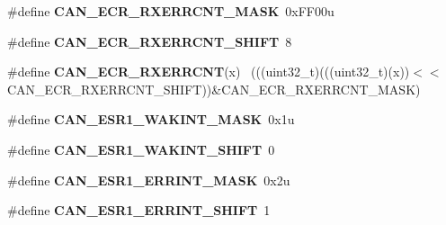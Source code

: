 \begin{DoxyCompactItemize}
\item 
\hypertarget{group___c_a_n___register___masks_gaed0f3cf7cea69b12a5166e67ad58b98e}{}\#define {\bfseries C\+A\+N\+\_\+\+E\+C\+R\+\_\+\+R\+X\+E\+R\+R\+C\+N\+T\+\_\+\+M\+A\+S\+K}~0x\+F\+F00u\label{group___c_a_n___register___masks_gaed0f3cf7cea69b12a5166e67ad58b98e}

\item 
\hypertarget{group___c_a_n___register___masks_ga8211d5f10448105a549f3f4085813922}{}\#define {\bfseries C\+A\+N\+\_\+\+E\+C\+R\+\_\+\+R\+X\+E\+R\+R\+C\+N\+T\+\_\+\+S\+H\+I\+F\+T}~8\label{group___c_a_n___register___masks_ga8211d5f10448105a549f3f4085813922}

\item 
\hypertarget{group___c_a_n___register___masks_gafe28c53e9c183d95b4570010e4529a84}{}\#define {\bfseries C\+A\+N\+\_\+\+E\+C\+R\+\_\+\+R\+X\+E\+R\+R\+C\+N\+T}(x)                                        ~(((uint32\+\_\+t)(((uint32\+\_\+t)(x))$<$$<$C\+A\+N\+\_\+\+E\+C\+R\+\_\+\+R\+X\+E\+R\+R\+C\+N\+T\+\_\+\+S\+H\+I\+F\+T))\&C\+A\+N\+\_\+\+E\+C\+R\+\_\+\+R\+X\+E\+R\+R\+C\+N\+T\+\_\+\+M\+A\+S\+K)\label{group___c_a_n___register___masks_gafe28c53e9c183d95b4570010e4529a84}

\item 
\hypertarget{group___c_a_n___register___masks_gaebf477ebf4b3df88922476e9ac121e06}{}\#define {\bfseries C\+A\+N\+\_\+\+E\+S\+R1\+\_\+\+W\+A\+K\+I\+N\+T\+\_\+\+M\+A\+S\+K}~0x1u\label{group___c_a_n___register___masks_gaebf477ebf4b3df88922476e9ac121e06}

\item 
\hypertarget{group___c_a_n___register___masks_ga146781b97b78d98eb3925860a96cf217}{}\#define {\bfseries C\+A\+N\+\_\+\+E\+S\+R1\+\_\+\+W\+A\+K\+I\+N\+T\+\_\+\+S\+H\+I\+F\+T}~0\label{group___c_a_n___register___masks_ga146781b97b78d98eb3925860a96cf217}

\item 
\hypertarget{group___c_a_n___register___masks_ga18448e13304efd0d4fe37d26c60c3a05}{}\#define {\bfseries C\+A\+N\+\_\+\+E\+S\+R1\+\_\+\+E\+R\+R\+I\+N\+T\+\_\+\+M\+A\+S\+K}~0x2u\label{group___c_a_n___register___masks_ga18448e13304efd0d4fe37d26c60c3a05}

\item 
\hypertarget{group___c_a_n___register___masks_gacee94f8f13909a6e02234076eecda564}{}\#define {\bfseries C\+A\+N\+\_\+\+E\+S\+R1\+\_\+\+E\+R\+R\+I\+N\+T\+\_\+\+S\+H\+I\+F\+T}~1\label{group___c_a_n___register___masks_gacee94f8f13909a6e02234076eecda564}


\end{DoxyCompactItemize}
